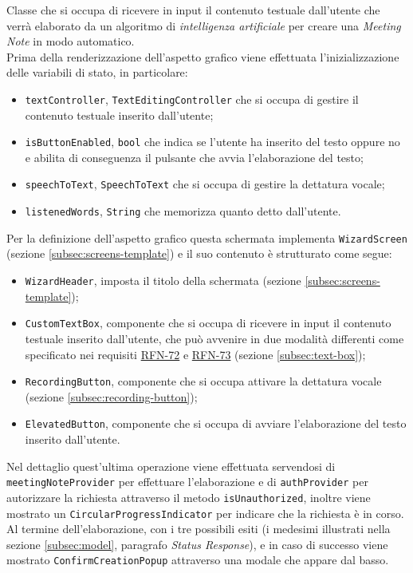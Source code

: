 Classe che si occupa di ricevere in input il contenuto testuale dall'utente che verrà elaborato da un algoritmo di \emph{intelligenza artificiale} per creare una \emph{Meeting Note} in modo automatico. \\
Prima della renderizzazione dell'aspetto grafico viene effettuata l'inizializzazione delle variabili di stato, in particolare:
\begin{itemize}
    \item \lstinline{textController}, \lstinline{TextEditingController}\cite{site:text-editing-controller} che si occupa di gestire il contenuto testuale inserito dall'utente;
    \item \lstinline{isButtonEnabled}, \lstinline{bool} che indica se l'utente ha inserito del testo oppure no e abilita di conseguenza il pulsante che avvia l'elaborazione del testo;
    \item \lstinline{speechToText}, \lstinline{SpeechToText}\cite{site:speech-to-text} che si occupa di gestire la dettatura vocale;
    \item \lstinline{listenedWords}, \lstinline{String} che memorizza quanto detto dall'utente.
\end{itemize}
Per la definizione dell'aspetto grafico questa schermata implementa \lstinline{WizardScreen} (sezione \ref{subsec:screens-template}) e il suo contenuto è strutturato come segue:
\begin{itemize}
    \item \lstinline{WizardHeader}, imposta il titolo della schermata (sezione \ref{subsec:screens-template});
    \item \lstinline{CustomTextBox}, componente che si occupa di ricevere in input il contenuto testuale inserito dall'utente, che può avvenire in due modalità differenti come specificato nei requisiti \hyperref[RFN-72]{RFN-72} e \hyperref[RFN-73]{RFN-73} (sezione \ref{subsec:text-box});
    \item \lstinline{RecordingButton}, componente che si occupa attivare la dettatura vocale (sezione \ref{subsec:recording-button});
    \item \lstinline{ElevatedButton}\cite{site:elevated-button}, componente che si occupa di avviare l'elaborazione del testo inserito dall'utente.
\end{itemize}
Nel dettaglio quest'ultima operazione viene effettuata servendosi di \lstinline{meetingNoteProvider} per effettuare l'elaborazione e di \lstinline{authProvider} per autorizzare la richiesta attraverso il metodo \lstinline{isUnauthorized}, inoltre viene mostrato un \lstinline{CircularProgressIndicator}\cite{site:circular-progress-indicator} per indicare che la richiesta è in corso. \\
Al termine dell'elaborazione, con i tre possibili esiti (i medesimi illustrati nella sezione \ref{subsec:model}, paragrafo \emph{Status Response}), e in caso di successo viene mostrato \lstinline{ConfirmCreationPopup} attraverso una modale che appare dal basso.

